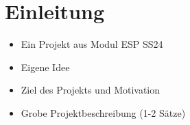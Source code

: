 \newpage
\section{Einleitung}
\begin{itemize}
    \item Ein Projekt aus Modul ESP SS24
    \item Eigene Idee
    \item Ziel des Projekts und Motivation
    \item Grobe Projektbeschreibung (1-2 Sätze)
\end{itemize}
    